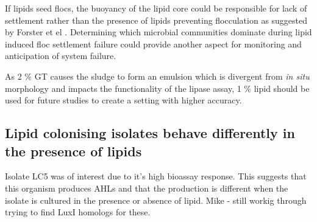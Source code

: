 \documentclass[11pt]{article}
\begin{document}
If lipids seed flocs, the buoyancy of the lipid core could be responsible for lack of settlement rather than the presence of lipids preventing flocculation as suggested by Forster et el \citep{Forster_92}. Determining which microbial communities dominate during lipid induced floc settlement failure could provide another aspect for monitoring and anticipation of system failure.


As 2 \% GT causes the sludge to form an emulsion which is divergent from \emph{in situ} morphology and impacts the functionality of the lipase assay, 1 \% lipid should be used for future studies to create a setting with higher accuracy.

\subsection{Lipid colonising isolates behave differently in the presence of lipids}

Isolate LC5 was of interest due to it's high bioassay response. This suggests that this organism produces AHLs and that the production is different when the isolate is cultured in the presence or absence of lipid.
Mike - still workig through trying to find LuxI homologs for these.

\end{document}
